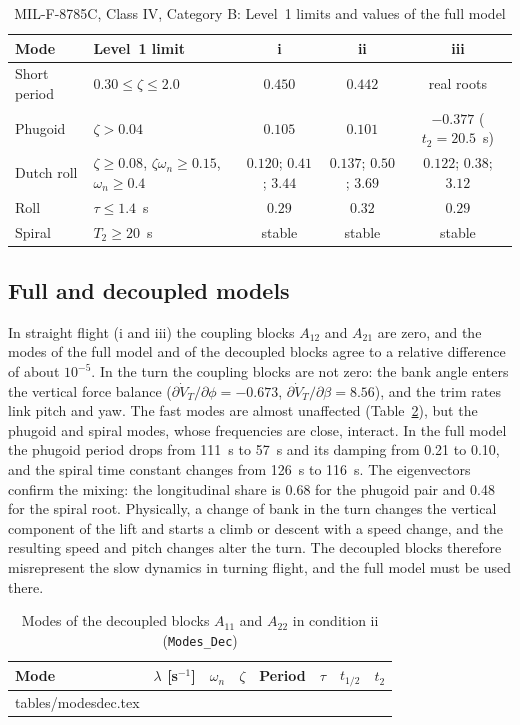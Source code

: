 \documentclass[conf]{new-aiaa}
\makeatletter
\newcommand\tabinput[1]{\@@input #1 }
\makeatother
\begin{document}
\begin{table}[hbt!]
\caption{\label{tab:hq} MIL-F-8785C, Class IV, Category B: Level~1 limits and values of the full model}
\centering
\small
\begin{tabular}{llccc}
\toprule
Mode & Level~1 limit & i & ii & iii \\
\midrule
Short period & $0.30\le\zeta\le2.0$ & $0.450$ & $0.442$ & real roots \\
Phugoid & $\zeta>0.04$ & $0.105$ & $0.101$ & $-0.377$ ($t_2=20.5$~s) \\
Dutch roll & $\zeta\ge0.08$, $\zeta\omega_n\ge0.15$, $\omega_n\ge0.4$ & $0.120$; $0.41$; $3.44$ & $0.137$; $0.50$; $3.69$ & $0.122$; $0.38$; $3.12$ \\
Roll & $\tau\le1.4$~s & $0.29$ & $0.32$ & $0.29$ \\
Spiral & $T_2\ge20$~s & stable & stable & stable \\
\bottomrule
\end{tabular}
\end{table}

\subsection{Full and decoupled models}
In straight flight (i and iii) the coupling blocks $A_{12}$ and $A_{21}$ are zero, and the modes of the full model and of the decoupled blocks agree to a relative difference of about $10^{-5}$. In the turn the coupling blocks are not zero: the bank angle enters the vertical force balance ($\partial\dot V_T/\partial\phi=-0.673$, $\partial\dot V_T/\partial\beta=8.56$), and the trim rates link pitch and yaw. The fast modes are almost unaffected (Table~\ref{tab:modesdec}), but the phugoid and spiral modes, whose frequencies are close, interact. In the full model the phugoid period drops from 111~s to 57~s and its damping from 0.21 to 0.10, and the spiral time constant changes from 126~s to 116~s. The eigenvectors confirm the mixing: the longitudinal share is 0.68 for the phugoid pair and 0.48 for the spiral root. Physically, a change of bank in the turn changes the vertical component of the lift and starts a climb or descent with a speed change, and the resulting speed and pitch changes alter the turn. The decoupled blocks therefore misrepresent the slow dynamics in turning flight, and the full model must be used there.

\begin{table}[hbt!]
\caption{\label{tab:modesdec} Modes of the decoupled blocks $A_{11}$ and $A_{22}$ in condition ii (\texttt{Modes\_Dec})}
\centering
\small
\begin{tabular}{llcccccc}
\toprule
Mode & $\lambda$ [s$^{-1}$] & $\omega_n$ & $\zeta$ & Period & $\tau$ & $t_{1/2}$ & $t_2$ \\
\midrule
\tabinput{tables/modesdec.tex}
\bottomrule
\end{tabular}
\end{table}
\end{document}
